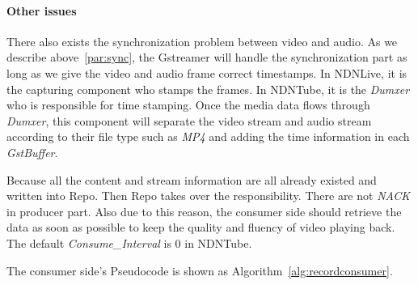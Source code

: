 \paragraph{Other issues} %
\label{par:synchronization_between_video_and_audio}
There also exists the synchronization problem between video and audio. As we describe above~\ref{par:sync}, the Gstreamer will handle the synchronization part as long as we give the video and audio frame correct timestamps. In NDNLive, it is the capturing component who stamps the frames. In NDNTube, it is the \textit{Dumxer} who is responsible for time stamping. Once the media data flows through \textit{Dumxer}, this component will separate the video stream and audio stream according to their file type such as \textit{MP4} and adding the time information in each \textit{GstBuffer}.

Because all the content and stream information are all already existed and written into Repo. Then Repo takes over the responsibility. There are not \textit{NACK} in producer part. Also due to this reason, the consumer side should retrieve the data as soon as possible to keep the quality and fluency of video playing back. The default \textit{Consume\_Interval} is 0 in NDNTube.  

The consumer side's Pseudocode is shown as Algorithm~\ref{alg:recordconsumer}.

